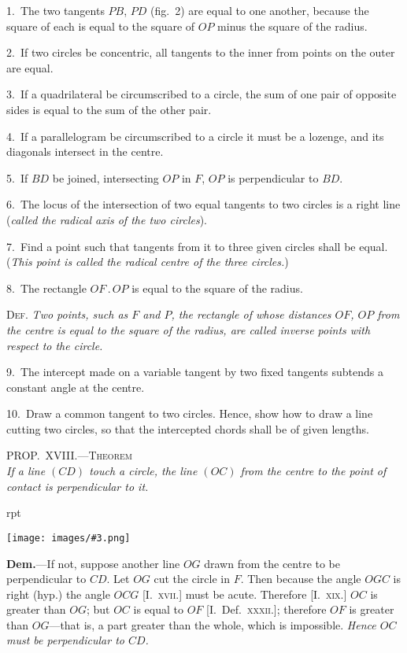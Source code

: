\documentclass[oneside]{book}
\newcounter{wrapwidth}
\newcommand\myprop[2]{
\bigskip\Needspace*{4\baselineskip}\begin{center}\textsc{#1}\\\medskip\emph{#2}\par\end{center}
}
\newcommand\imgflow[3]{
\setcounter{wrapwidth}{#1}
\begin{wrapfigure}[#2]{r}{\value{wrapwidth}pt}
\begin{center}
\vspace{-0.3in}
\texttt{[image: images/\#3.png]}
\end{center}
\end{wrapfigure}
}
\begin{document}
\begin{footnotesize}
1.~The two tangents $PB$, $PD$ (fig.~2) are equal to one another,
because the square of each is equal to the square of $OP$ minus the
square of the radius.

2.~If two circles be concentric, all tangents to the inner from
points on the outer are equal.

3.~If a quadrilateral be circumscribed to a circle, the sum
of one pair of opposite sides is equal to the sum of the other
pair.

4.~If a parallelogram be circumscribed to a circle it must be
a lozenge, and its diagonals intersect in the centre.

5.~If $BD$ be joined, intersecting $OP$ in $F$, $OP$ is perpendicular
to $BD$.

6.~The locus of the intersection of two equal tangents to two
circles is a right line (\emph{called the radical axis of the two circles}).

7.~Find a point such that tangents from it to three given circles
shall be equal. (\emph{This point is called the radical centre of the three
circles.})

8.~The rectangle $OF\,.\,OP$ is equal to the square of the radius.

\textsc{Def.} \emph{Two points, such as $F$ and $P$, the rectangle of whose
distances $OF$, $OP$ from the centre is equal to the square of the
radius, are called inverse points with respect to the circle.}

9.~The intercept made on a variable tangent by two fixed tangents
subtends a constant angle at the centre.

10.~Draw a common tangent to two circles. Hence, show how
to draw a line cutting two circles, so that the intercepted chords
shall be of given lengths.
\par\end{footnotesize}

\myprop{PROP\@.~XVIII\@.---Theorem}{If a line $(CD)$ touch a circle, the line $(OC)$ from the centre
to the point of contact is perpendicular to it.}

\imgflow{135}{11}{f124}

\textbf{Dem.}---If not, suppose another line $OG$ drawn from
the centre to be perpendicular
to $CD$. Let $OG$ cut the
circle in $F$. Then because
the angle $OGC$ is right (hyp.)
the angle $OCG$ [I.~\textsc{xvii.}]
must be acute. Therefore
[I.~\textsc{xix.}] $OC$ is greater than
$OG$; but $OC$ is equal to $OF$
[I.~Def.~\textsc{xxxii.}]; therefore
$OF$ is greater than $OG$---that
is, a part greater than the
whole, which is impossible. \emph{Hence $OC$ must be perpendicular
to $CD$.}\par\smallskip
\end{document}
